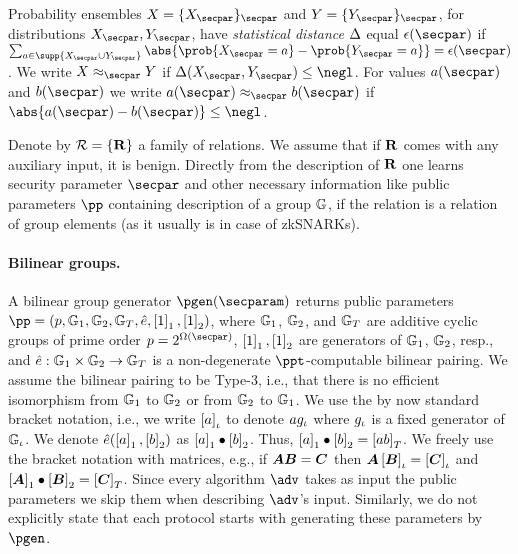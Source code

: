 \let\accentvec\vec \documentclass[runningheads,10pt]{llncs}
\def\vec#1{\mathchoice{\mbox{\boldmath$\displaystyle#1$}}
{\mbox{\boldmath$\textstyle#1$}} {\mbox{\boldmath$\scriptstyle#1$}}
{\mbox{\boldmath$\scriptscriptstyle#1$}}}
\begin{document}
Probability ensembles $X = \smallset{X_\secpar}_\secpar$ and
$Y = \smallset{Y_\secpar}_\secpar$, for distributions $X_\secpar, Y_\secpar$, have \emph{statistical distance} $\Delta$ equal
$\epsilon(\secpar)$ if $\sum_{a \in \supp{X_\secpar \cup Y_\secpar}}
\abs{\prob{X_\secpar = a} - \prob{Y_\secpar = a}} = \epsilon(\secpar)$.  We
write $X \approx_\secpar Y$ if $\SD(X_\secpar, Y_\secpar) \leq \negl$.  
For values $a(\secpar)$ and $b(\secpar)$ we write $a(\secpar) \approx_\secpar
b(\secpar)$ if $\abs{a(\secpar) - b(\secpar)} \leq \negl$.  

Denote by $\mathcal{R} = \{\mathbf{R}\}$ a family of relations. We assume that if
$\mathbf{R}$ comes with any auxiliary input, it is benign. Directly from the
description of $\mathbf{R}$ one learns security parameter $\secpar$ and other
necessary information like public parameters $\pp$ containing description of a
group $\mathbb{G}$, if the relation is a relation of group elements (as it usually
is in case of zkSNARKs).

\paragraph{Bilinear groups.}
A bilinear group generator $\pgen (\secparam)$ returns public parameters $ \pp
= (p, \GRP_1, \GRP_2, \GRP_T, \pair, \gone{1}, \gtwo{1})$, where $\mathbb{G}_1$,
$\mathbb{G}_2$, and $\mathbb{G}_T$ are additive cyclic groups of prime order $p =
2^{\Omega (\secpar)}$, $\left[1\right]_{1}, \left[1\right]_{2}$ are generators of $\mathbb{G}_1$,
$\mathbb{G}_2$, resp., and $\hat{e}: \mathbb{G}_1 \times \mathbb{G}_2 \to \mathbb{G}_T$ is a
non-degenerate $\ppt$-computable bilinear pairing.  We assume the bilinear
pairing to be Type-3, i.e., that there is no efficient isomorphism from
$\mathbb{G}_1$ to $\mathbb{G}_2$ or from $\mathbb{G}_2$ to $\mathbb{G}_1$.  We use the by now standard
bracket notation, i.e., we write $\left[a\right]_{\iota}$ to denote $a g_{\iota}$ where
$g_{\iota}$ is a fixed generator of $\mathbb{G}_{\iota}$.  We denote $\hat{e} (\left[a\right]_{1},
\left[b\right]_{2})$ as $\left[a\right]_{1} \bullet \left[b\right]_{2}$.  Thus, $\left[a\right]_{1} \bullet \left[b\right]_{2} =
\left[a b\right]_{T}$.  We freely use the bracket notation with matrices, e.g., if
$\vec{A} \vec{B} = \vec{C}$ then $\vec{A} \grpgi{\vec{B}} = \grpgi{\vec{C}}$
and $\gone{\vec{A}}\bullet \gtwo{\vec{B}} = \gtar{\vec{C}}$.
Since every algorithm $\adv$ takes as input the public parameters we
skip them when describing $\adv$'s input. Similarly, we do not explicitly
state that each protocol starts with generating these parameters by $\pgen$.
\end{document}
